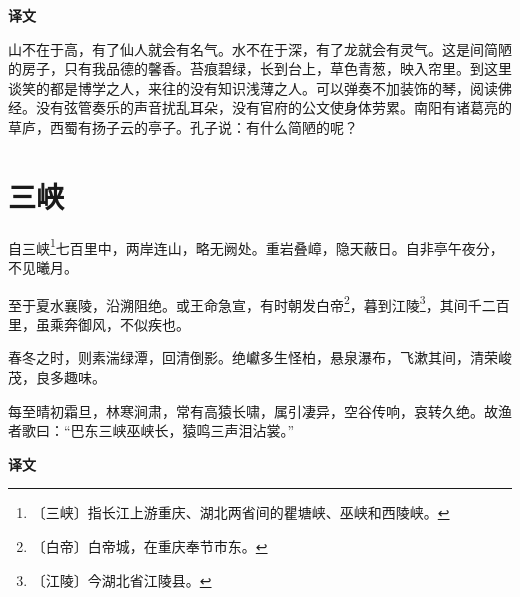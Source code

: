 \documentclass[12pt,UTF-8,openany,a4]{ctexbook}
\begin{document}
\newpage

\begin{Large}
    \noindent\textbf{译文}
\end{Large}


\vspace{1em}

\begin{large}
    \yiwen 
    山不在于高，有了仙人就会有名气。水不在于深，有了龙就会有灵气。这是间简陋的房子，只有我品德的馨香。苔痕碧绿，长到台上，草色青葱，映入帘里。到这里谈笑的都是博学之人，来往的没有知识浅薄之人。可以弹奏不加装饰的琴，阅读佛经。没有弦管奏乐的声音扰乱耳朵，没有官府的公文使身体劳累。南阳有诸葛亮的草庐，西蜀有扬子云的亭子。孔子说：有什么简陋的呢？
    
\end{large}



\chapter{三峡}

\begin{large}
    
    自三峡\footnote{〔三峡〕\yiwen 指长江上游重庆、湖北两省间的瞿塘峡、巫峡和西陵峡。}七百里中，两岸连山，略无阙处。重岩叠嶂，隐天蔽日。自非亭午夜分，不见曦月。
    
    至于夏水襄陵，沿溯阻绝。或王命急宣，有时朝发白帝\footnote{〔白帝〕\yiwen 白帝城，在重庆奉节市东。}，暮到江陵\footnote{〔江陵〕\yiwen 今湖北省江陵县。}，其间千二百里，虽乘奔御风，不似疾也。
    
    春冬之时，则素湍绿潭，回清倒影。绝巘多生怪柏，悬泉瀑布，飞漱其间，清荣峻茂，良多趣味。
    
    每至晴初霜旦，林寒涧肃，常有高猿长啸，属引凄异，空谷传响，哀转久绝。故渔者歌曰：“巴东三峡巫峡长，猿鸣三声泪沾裳。”
\end{large}


\newpage

\begin{Large}
    \noindent\textbf{译文}
\end{Large}


\vspace{1em}
\end{document}
